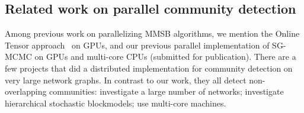 \begin{comment}
Then we obtain the normalization term by $Z_{ab}^{(y)} = \sm{k}{K}f_{ab}^{(y)}(k)$. 
Integrating out the expectation in Eqn. \eqref{eqn:grad_local}, we obtain 
\bea
g_{ab}(\phi_{ak}) = \f{f_{ab}^{(y)}(k)}{Z_{ab}^{(y)}\phi_{ak}} - \f{1}{\phi_a}.
\eea 
Plugging this to Eqn. \ref{eqn:sgrld_update}, we obtain the SGRLD update rule for the local parameter $\phi_{ak}$
\bea
\phi_{ak}^* \law \left| \phi_{ak} + \f{\ep}{2} \left( \al - \phi_{ak} + \f{N}{|\Neighbors|} \sum_{b \in \Neighbors} g_{ab}(\phi_{ak})\right) \right. \nn \\ \left. + (\phi_{ak})^{\ha} \xi_{ak}\right|.\label{eqn:local_update}
\eea
Here, the $\Neighbors$ is the neighbor set for a mini-batch node, another random mini-batch of $n$ nodes sampled from $\cV$. Note that $|\Neighbors| \ll |\cV|=N$.

\end{comment}

\subsection{Related work on parallel community detection}

Among previous work on parallelizing MMSB algorithms, we mention the Online
Tensor approach~\cite{DBLP:journals/corr/HuangNHVA13} on GPUs, and our previous
parallel implementation of SG-MCMC on GPUs and multi-core CPUs (submitted for
publication). There are a few projects that did a distributed implementation
for community detection on very large network graphs. In contrast to our work,
they all detect non-overlapping communities: \cite{Bu2013246} investigate a
large number of networks; \cite{2015arXiv150302115L} investigate hierarchical
stochastic blockmodels; \cite{Prat-Perez:2014:HQS:2566486.2568010} use
multi-core machines.

\begin{comment}
In this paper, we describe our custom RDMA D-KV (Distributed Key-Value)
store. Current RMDA D-KV store implementations are RamCloud~\cite{RamCloud},
Pilaf~\cite{Pilaf}, Herd~\cite{Herd} and FaRM~\cite{FaRM}. All these systems
use RDMA to implement a D-KV store. However, all of them are far more powerful
than our custom implementation -- and this power comes at a cost that we
can avoid. They implement a generic D-KV store that controls concurrency,
supports dynamic inserts and deletes, supports variable-sized values
(whose size may change at an update), and keys of arbitrary type. Because
of the nature of our distributed algorithm, we have to deal with none of
these issues. For us, values are fixed-size, allocated only at the initial
population, and remain alive forever. We have no concurrency between writes
and reads or other writes. Our keys are a contiguous range of integers. All
these properties together allow an extremely low-overhead implementation
that does not involve the remote host in any transaction.
\end{comment}
